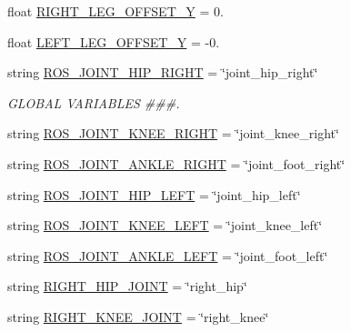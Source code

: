 \begin{DoxyCompactItemize}
\item 
float \mbox{\hyperlink{namespacecapture__pedal__trajectory_abc5f034cd21c3878a3d10594ad89e589}{R\+I\+G\+H\+T\+\_\+\+L\+E\+G\+\_\+\+O\+F\+F\+S\+E\+T\+\_\+Y}} = 0.
\item 
float \mbox{\hyperlink{namespacecapture__pedal__trajectory_a624e3b2ffb27de7ac8ef0f742d2902c5}{L\+E\+F\+T\+\_\+\+L\+E\+G\+\_\+\+O\+F\+F\+S\+E\+T\+\_\+Y}} = -\/0.
\item 
string \mbox{\hyperlink{namespacecapture__pedal__trajectory_ace3bd5ff6f7bfb6e65aadc4487a89ffe}{R\+O\+S\+\_\+\+J\+O\+I\+N\+T\+\_\+\+H\+I\+P\+\_\+\+R\+I\+G\+HT}} = \char`\"{}joint\+\_\+hip\+\_\+right\char`\"{}
\begin{DoxyCompactList}\small\item\em G\+L\+O\+B\+AL V\+A\+R\+I\+A\+B\+L\+ES \#\#\#. \end{DoxyCompactList}\item 
string \mbox{\hyperlink{namespacecapture__pedal__trajectory_a79c63fa5ca37fc7f030568dfe7079f73}{R\+O\+S\+\_\+\+J\+O\+I\+N\+T\+\_\+\+K\+N\+E\+E\+\_\+\+R\+I\+G\+HT}} = \char`\"{}joint\+\_\+knee\+\_\+right\char`\"{}
\item 
string \mbox{\hyperlink{namespacecapture__pedal__trajectory_ae399b4f7124a1cd67c10a5ff5a0efba5}{R\+O\+S\+\_\+\+J\+O\+I\+N\+T\+\_\+\+A\+N\+K\+L\+E\+\_\+\+R\+I\+G\+HT}} = \char`\"{}joint\+\_\+foot\+\_\+right\char`\"{}
\item 
string \mbox{\hyperlink{namespacecapture__pedal__trajectory_af2271fa55dd911979e17d7a7bd891e42}{R\+O\+S\+\_\+\+J\+O\+I\+N\+T\+\_\+\+H\+I\+P\+\_\+\+L\+E\+FT}} = \char`\"{}joint\+\_\+hip\+\_\+left\char`\"{}
\item 
string \mbox{\hyperlink{namespacecapture__pedal__trajectory_a2573f1326727542b82629e3ba73f57fd}{R\+O\+S\+\_\+\+J\+O\+I\+N\+T\+\_\+\+K\+N\+E\+E\+\_\+\+L\+E\+FT}} = \char`\"{}joint\+\_\+knee\+\_\+left\char`\"{}
\item 
string \mbox{\hyperlink{namespacecapture__pedal__trajectory_a07733166d6384f69b9880e18c9c70fb3}{R\+O\+S\+\_\+\+J\+O\+I\+N\+T\+\_\+\+A\+N\+K\+L\+E\+\_\+\+L\+E\+FT}} = \char`\"{}joint\+\_\+foot\+\_\+left\char`\"{}
\item 
string \mbox{\hyperlink{namespacecapture__pedal__trajectory_a82263d3cb2967d2b210c72d013362610}{R\+I\+G\+H\+T\+\_\+\+H\+I\+P\+\_\+\+J\+O\+I\+NT}} = \char`\"{}right\+\_\+hip\char`\"{}
\item 
string \mbox{\hyperlink{namespacecapture__pedal__trajectory_a13c6b4844291f74230c8fa8376e4c14f}{R\+I\+G\+H\+T\+\_\+\+K\+N\+E\+E\+\_\+\+J\+O\+I\+NT}} = \char`\"{}right\+\_\+knee\char`\"{}

\end{DoxyCompactItemize}
